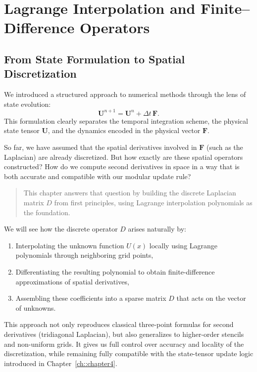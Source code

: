 \chapter{Lagrange Interpolation and Finite–Difference Operators}
\label{ch:chapter6}

\section{From State Formulation to Spatial Discretization}

We introduced a structured approach to numerical methods through the lens of state evolution:
\[
\mathbf{U}^{n+1} = \mathbf{U}^n + \Delta t\, \mathbf{F}.
\]
This formulation clearly separates the temporal integration scheme, the physical state tensor \(\mathbf{U}\), and the dynamics encoded in the physical vector \(\mathbf{F}\).

So far, we have assumed that the spatial derivatives involved in \(\mathbf{F}\) (such as the Laplacian) are already discretized. But how exactly are these spatial operators constructed? How do we compute second derivatives in space in a way that is both accurate and compatible with our modular update rule?

\begin{quote}
This chapter answers that question by building the discrete Laplacian matrix \(D\) from first principles, using Lagrange interpolation polynomials as the foundation.
\end{quote}

We will see how the discrete operator \(D\) arises naturally by:
\begin{enumerate}
  \item Interpolating the unknown function \(U(x)\) locally using Lagrange polynomials through neighboring grid points,
  \item Differentiating the resulting polynomial to obtain finite-difference approximations of spatial derivatives,
  \item Assembling these coefficients into a sparse matrix \(D\) that acts on the vector of unknowns.
\end{enumerate}

This approach not only reproduces classical three-point formulas for second derivatives (tridiagonal Laplacian), but also generalizes to higher-order stencils and non-uniform grids. It gives us full control over accuracy and locality of the discretization, while remaining fully compatible with the state-tensor update logic introduced in Chapter~\ref{ch::chapter4}.


